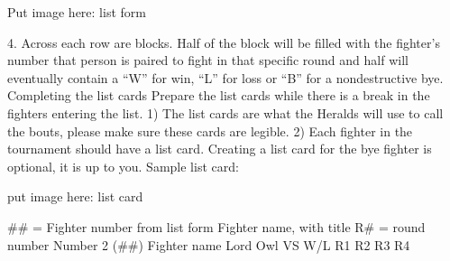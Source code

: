 \documentclass{article}
\begin{document}
Put image here: list form

4. Across each row are blocks. Half of the block will be filled with the fighter’s number that person is
paired to fight in that specific round and half will eventually contain a “W” for win, “L” for loss or
“B” for a nondestructive bye.
Completing the list cards
Prepare the list cards while there is a break in the fighters entering the list.
1) The list cards are what the Heralds will use to call the bouts, please make sure these cards are legible.
2) Each fighter in the tournament should have a list card. Creating a list card for the bye fighter is
optional, it is up to you.
Sample list card:

put image here: list card

\#\# = Fighter number from list form
Fighter name, with title
R\# = round number
Number 2 (\#\#)
Fighter name
Lord Owl
VS W/L
R1
R2
R3
R4
\end{document}
